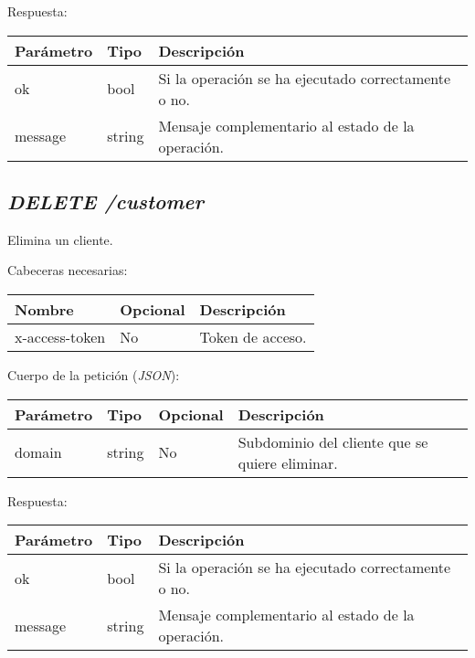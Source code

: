Respuesta:
\begin{table}[h!]
	\centering
	\begin{adjustbox}{max width=\textwidth}
	\begin{tabular}{|l|l|l|}
		\hline
		Parámetro & Tipo & Descripción \\ \hline
		ok & bool & Si la operación se ha ejecutado correctamente o no. \\ \hline
		message & string & Mensaje complementario al estado de la operación. \\ \hline
	\end{tabular}
\end{adjustbox}
\end{table}






\subsection{\textit{DELETE /customer}}
Elimina un cliente.

Cabeceras necesarias:
\begin{table}[h!]
	\centering
	\begin{adjustbox}{max width=\textwidth}
	\begin{tabular}{|l|l|l|}
		\hline
		Nombre & Opcional & Descripción \\ \hline
		x-access-token & No & Token de acceso. \\ \hline
	\end{tabular}
\end{adjustbox}
\end{table}

Cuerpo de la petición (\textit{JSON}):
\begin{table}[h!]
	\centering
	\begin{adjustbox}{max width=\textwidth}
	\begin{tabular}{|l|l|l|l|}
		\hline
		Parámetro & Tipo & Opcional & Descripción \\ \hline
		domain & string & No & Subdominio del cliente que se quiere eliminar. \\ \hline
	\end{tabular}
\end{adjustbox}
\end{table}

Respuesta:
\begin{table}[h!]
	\centering
	\begin{adjustbox}{max width=\textwidth}
	\begin{tabular}{|l|l|l|}
		\hline
		Parámetro & Tipo & Descripción \\ \hline
		ok & bool & Si la operación se ha ejecutado correctamente o no. \\ \hline
		message & string & Mensaje complementario al estado de la operación. \\ \hline
	\end{tabular}
\end{adjustbox}
\end{table}


